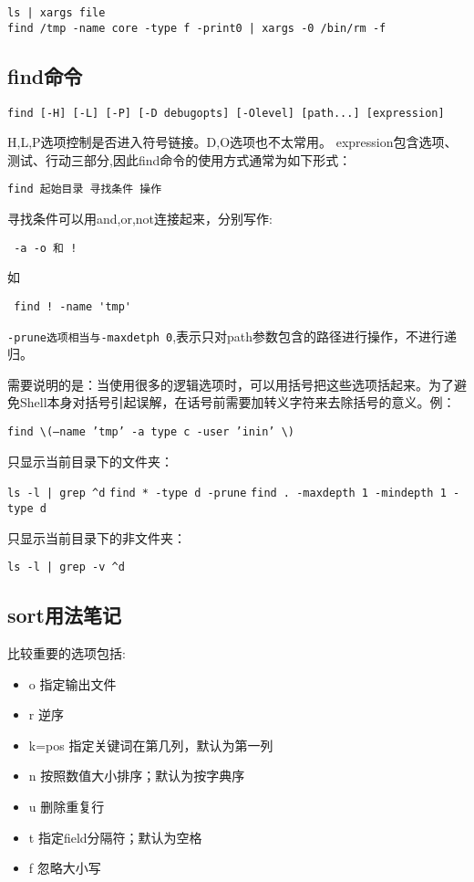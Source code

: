\begin{verbatim}
ls | xargs file
find /tmp -name core -type f -print0 | xargs -0 /bin/rm -f
\end{verbatim}

\subsection{find命令}
\begin{verbatim}
find [-H] [-L] [-P] [-D debugopts] [-Olevel] [path...] [expression]
\end{verbatim}
H,L,P选项控制是否进入符号链接。D,O选项也不太常用。
expression包含选项、测试、行动三部分,因此find命令的使用方式通常为如下形式：

\verb+find 起始目录 寻找条件 操作+

寻找条件可以用and,or,not连接起来，分别写作:

\verb+ -a -o 和 !+

如

\verb+ find ! -name 'tmp'+

\verb+-prune选项相当与-maxdetph 0+,表示只对path参数包含的路径进行操作，不进行递归。

需要说明的是：当使用很多的逻辑选项时，可以用括号把这些选项括起来。为了避免Shell本身对括号引起误解，在话号前需要加转义字符来去除括号的意义。例：

\verb+find \(–name ’tmp’ -a type c -user ’inin’ \)+


只显示当前目录下的文件夹：

\verb+ls -l | grep ^d+
\verb+find * -type d -prune+
\verb+find . -maxdepth 1 -mindepth 1 -type d+

只显示当前目录下的非文件夹：

\verb+ls -l | grep -v ^d+

\subsection{sort用法笔记}
比较重要的选项包括:

\begin{itemize}
    \item o 指定输出文件
    \item r 逆序
    \item k=pos 指定关键词在第几列，默认为第一列
    \item n 按照数值大小排序；默认为按字典序
    \item u 删除重复行
    \item t 指定field分隔符；默认为空格
    \item f 忽略大小写 
\end{itemize}


